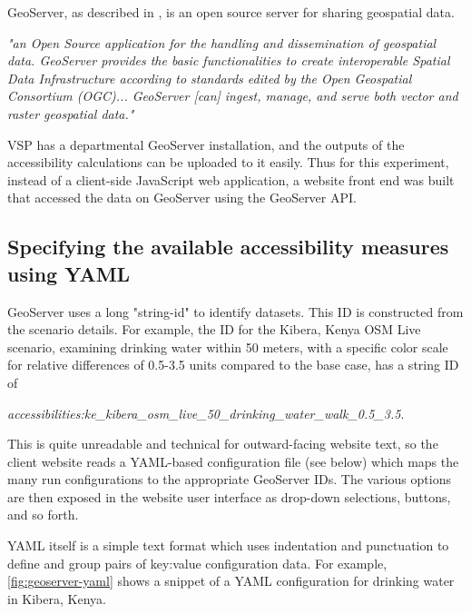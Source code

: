 \gls{GeoServer}, as described in \cite{giannecchini2013geoserver}, is an open source server for sharing geospatial data.

\begin{displayquote}
\emph{"an Open Source application for the handling and dissemination of geospatial data. GeoServer provides the basic functionalities to create interoperable Spatial Data Infrastructure according to standards edited by the Open Geospatial Consortium (OGC)... GeoServer [can] ingest, manage, and serve both vector and raster geospatial data."}
\end{displayquote}

VSP has a departmental GeoServer installation, and the outputs of the accessibility calculations can be uploaded to it easily. Thus for this experiment, instead of a client-side JavaScript web application, a website front end was built that accessed the data on GeoServer using the GeoServer API.

\hypertarget{server-experiments-geoserver-2}{%
\subsection{Specifying the available accessibility measures using YAML}
\label{server-experiments-geoserver-2}}

GeoServer uses a long "string-id" to identify datasets. This ID is constructed from the scenario details. For example, the ID for the Kibera, Kenya OSM Live scenario, examining drinking water within 50 meters, with a specific color scale for relative differences of 0.5-3.5 units compared to the base case, has a string ID of

\emph{accessibilities:ke\_kibera\_osm\_live\_50\_drinking\_water\_walk\_0.5\_3.5}.

This is quite unreadable and technical for outward-facing website text, so the client website reads a YAML-based configuration file (see below) which maps the many run configurations to the appropriate GeoServer IDs. The various options are then exposed in the website user interface as drop-down selections, buttons, and so forth.

YAML itself is a simple text format which uses indentation and punctuation to define and group pairs of key:value configuration data. For example, \autoref{fig:geoserver-yaml} shows a snippet of a YAML configuration for drinking water in Kibera, Kenya.

